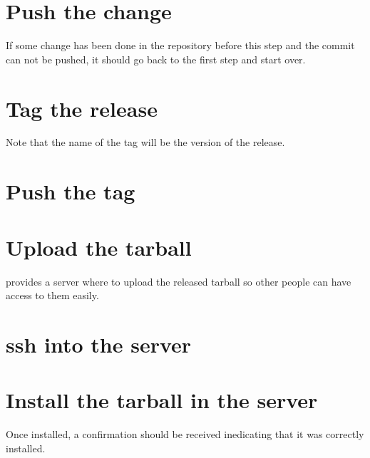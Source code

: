 \section*{Push the change}

\noindent{}

If some change has been done in the repository before this step and the commit can not be pushed, it should go back to the first step and start over.

\section*{Tag the release}

\noindent{}

Note that the name of the tag will be the version of the release.

\section*{Push the tag}

\noindent{}

\newpage
\section*{Upload the tarball}

\GNOME provides a server where to upload the released tarball so other people can have access to them easily.

\noindent{}

\section*{ssh into the server}

\noindent{}

\section*{Install the tarball in the server}

\noindent{}

Once installed, a confirmation should be received inedicating that it was correctly installed.
